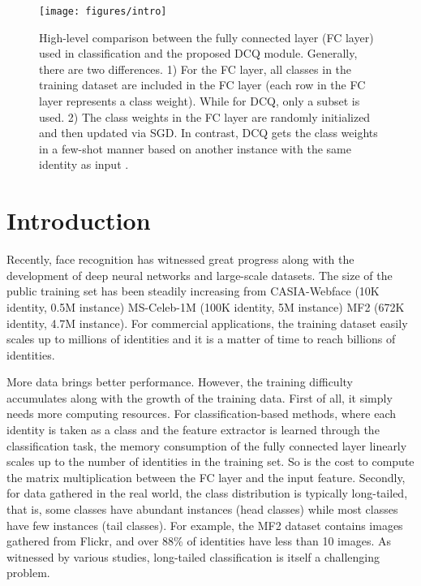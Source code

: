 \documentclass[10pt,twocolumn,letterpaper]{article}
\begin{document}
\begin{figure}[t]
   \centering
   \texttt{[image: figures/intro]}
   \caption{High-level comparison between the fully connected layer (FC layer) used in classification and the proposed DCQ module. Generally, there are two differences. 1) For the FC layer, all classes in the training dataset are included in the FC layer (each row in the FC layer represents a class weight). While for DCQ, only a subset is used. 2) The class weights in the FC layer are randomly initialized and then updated via SGD. In contrast, DCQ gets the class weights in a few-shot manner based on another instance  with the same identity as input .\label{fig:intro}}
\end{figure}

\section{Introduction}
Recently, face recognition has witnessed great progress along with the development of deep neural networks and large-scale datasets. The size of the public training set has been steadily increasing from CASIA-Webface\cite{yi2014learning} (10K identity, 0.5M instance)  MS-Celeb-1M\cite{guo2016ms} (100K identity, 5M instance)  MF2\cite{nech2017level} (672K identity, 4.7M instance). For commercial applications, the training dataset easily scales up to millions of identities and it is a matter of time to reach billions of identities.

More data brings better performance. However, the training difficulty accumulates along with the growth of the training data. First of all, it simply needs more computing resources. For classification-based methods, where each identity is taken as a class and the feature extractor is learned through the classification task, the memory consumption of the fully connected layer  linearly scales up to the number of identities  in the training set. So is the cost to compute the matrix multiplication between the FC layer and the input feature. Secondly, for data gathered in the real world, the class distribution is typically long-tailed, that is, some classes have abundant instances (head classes) while most classes have few instances (tail classes). For example, the MF2 dataset contains images gathered from Flickr, and over 88\% of identities have less than 10 images. As witnessed by various studies\cite{branco2016survey,zhang2017range,zhong_unequal-training_2019}, long-tailed classification is itself a challenging problem. 
\end{document}
